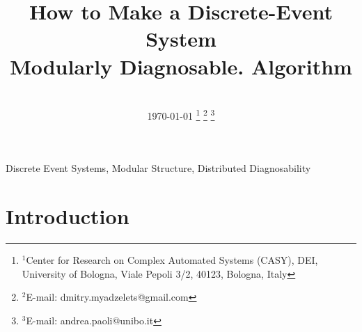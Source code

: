 \documentclass[a4paper, 10pt, conference]{ieeeconf}
\begin{document}
\title{How to Make a Discrete-Event System \\ Modularly Diagnosable.
Algorithm} 
\author{
	\\ \today
	\thanks{$^{1}$Center for Research on Complex Automated Systems (CASY), DEI,
	University of Bologna, Viale Pepoli 3/2, 40123, Bologna, Italy}
		\thanks{$^{2}$E-mail: {dmitry.myadzelets@gmail.com}}
		\thanks{$^{3}$E-mail: {andrea.paoli@unibo.it}}
}
\maketitle


\begin{abstract}

\end{abstract}

\begin{keywords}
Discrete Event Systems, Modular Structure, Distributed Diagnosability
\end{keywords}

\newtheorem{theorem}{Theorem}
\newtheorem{definition}{Definition}
\newtheorem{lemma}{Lemma}
\newtheorem{assumption}{Assumption}
\newtheorem{corollary}{Corollary}
\newtheorem{example}{Example}
\newtheorem{algorithm}{Algorithm}


\section{Introduction}
\end{document}
